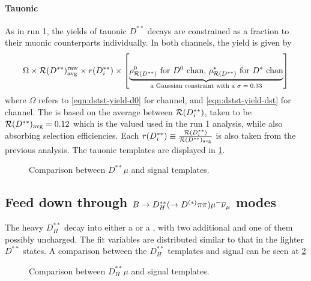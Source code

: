 \paragraph{Tauonic}
As in run 1, the yields of  tauonic $D^{**}$ decays are constrained as a
fraction to their muonic counterparts individually.
In both channels, the yield is given by
\begin{equation}
    \Omega \times \fitRDststRaw \times \fitRDiRatio \times \left[
        \underbrace{\text{\fitRDDstst for \Dz chan, \fitRDstst for \Dstar chan}}_\text{
            a Gaussian constraint with a $\sigma = 0.33$
        }
    \right]
\end{equation}
where $\Omega$ refers to \cref{eqn:dstst-yield-d0} for \Dz channel,
and \cref{eqn:dstst-yield-dst} for \Dstar channel.
The \fitRDststRaw is based on the average between $\mathcal{R}(D^{**}_i)$,
taken to be $\mathcal{R}(D^{**})_\text{avg} = 0.12$ which is the valued used in
the run 1 analysis,
while also absorbing selection efficiencies.
Each
$r(D^{**}_i) \equiv \frac{\mathcal{R}(D^{**}_i)}{\mathcal{R}(D^{**})_\text{avg}}$
is also taken from the previous analysis.
The tauonic \Dstst templates are displayed in \cref{fig:dstst-tau}.

\begin{figure}[!htb]

    \caption{Comparison between $D^{**}\mu$ and \Dz\taum signal templates.}
    \label{fig:dstst-tau}
\end{figure}


\subsection{Feed down through $B \rightarrow D_H^{**}(\rightarrow D^{(*)}\pi\pi){\mu^-}{{\overline{\nu}}_\mu}$ modes}

The heavy $D_H^{**}$ decay into either a \Dz or a \Dstar, with two additional
\pion and one of them possibly uncharged.
The fit variables are distributed similar to that in the lighter
$D^{**}$ states.
A comparison between the $D_H^{**}$ templates and \Dz\taum signal can be
seen at \ref{fig:dstst-heavy-vs-d0-sig}

\begin{figure}[!htb]

    \caption{Comparison between $D_H^{**}\mu$ and \Dz\taum signal templates.}
    \label{fig:dstst-heavy-vs-d0-sig}
\end{figure}


